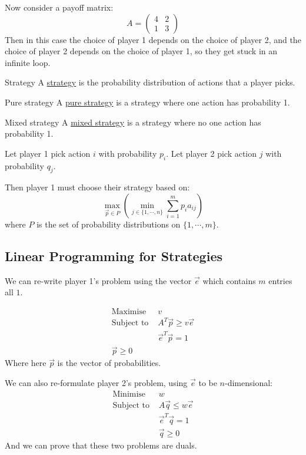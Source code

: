 \documentclass[../Main.tex]{subfiles}
\begin{document}
\begin{example}
    Now consider a payoff matrix:
    \begin{equation*}
        A =
        \begin{pmatrix}
            4 & 2 \\
            1 & 3
        \end{pmatrix} 
    \end{equation*}
    Then in this case the choice of player 1 depends on the choice of player 2, and the choice of player 2 depends on the choice of player 1, so they get stuck in an infinite loop.
\end{example}
\begin{definition}{Strategy}
    A \underline{strategy} is the probability distribution of actions that a player picks.
\end{definition}
\begin{definition}{Pure strategy}
    A \underline{pure strategy} is a strategy where one action has probability 1.
\end{definition}
\begin{definition}{Mixed strategy}
    A \underline{mixed strategy} is a strategy where no one action has probability 1.
\end{definition}
Let player 1 pick action $i$ with probability $p_i$. Let player 2 pick action $j$ with probability $q_j$.

Then player 1 must choose their strategy based on:
\begin{equation*}
    \max_{\vec{p} \in P} \left(\min_{j \in \{1, \cdots, n\}} \sum_{i = 1}^m p_i a_{ij}\right)
\end{equation*}
where $P$ is the set of probability distributions on $\{1, \cdots, m\}$.
\subsection{Linear Programming for Strategies}
We can re-write player 1's problem using the vector $\vec{e}$ which contains $m$ entries all $1$.

\begin{align*}
    \text{Maximise } &v \\
    \text{Subject to } &A^T \vec{p} \geq v\vec{e} \\
    &\vec{e}^T \vec{p} = 1 \\
    \vec{p} \geq 0
\end{align*}
Where here $\vec{p}$ is the vector of probabilities.

We can also re-formulate player 2's problem, using $\vec{e}$ to be $n$-dimensional:
\begin{align*}
    \text{Minimise } &w \\
    \text{Subject to } &A\vec{q} \leq w\vec{e} \\
    &\vec{e}^T \vec{q} = 1 \\
    &\vec{q} \geq 0
\end{align*}
And we can prove that these two problems are duals.
\end{document}

